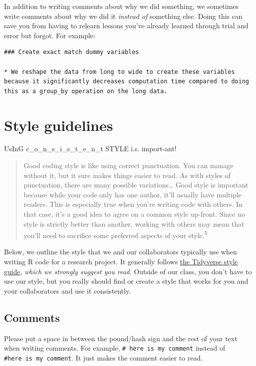 \documentclass[
  letterpaper,
  DIV=11,
  numbers=noendperiod]{scrreprt}
\begin{document}
In addition to writing comments about why we did something, we sometimes
write comments about why we did it \emph{instead of} something else.
Doing this can save you from having to relearn lessons you've already
learned through trial and error but forgot. For example:

\begin{verbatim}
### Create exact match dummy variables

* We reshape the data from long to wide to create these variables because it significantly decreases computation time compared to doing this as a group_by operation on the long data. 
\end{verbatim}

\section{Style guidelines}\label{style-guidelines}

UsInG c\_o\_n\_s\_i\_s\_t\_e\_n\_t STYLE i.s. import-ant!

\begin{quote}
Good coding style is like using correct punctuation. You can manage
without it, but it sure makes things easier to read. As with styles of
punctuation, there are many possible variations\ldots{} Good style is
important because while your code only has one author, it'll usually
have multiple readers. This is especially true when you're writing code
with others. In that case, it's a good idea to agree on a common style
up-front. Since no style is strictly better than another, working with
others may mean that you'll need to sacrifice some preferred aspects of
your style.\textsuperscript{5}
\end{quote}

Below, we outline the style that we and our collaborators typically use
when writing R code for a research project. It generally follows
\href{https://style.tidyverse.org/}{the Tidyverse style guide},
\emph{which we strongly suggest you read}. Outside of our class, you
don't have to use our style, but you really should find or create a
style that works for you and your collaborators and use it consistently.

\subsection{Comments}\label{comments-1}

Please put a space in between the pound/hash sign and the rest of your
text when writing comments. For example,
\texttt{\#\ here\ is\ my\ comment} instead of
\texttt{\#here\ is\ my\ comment}. It just makes the comment easier to
read.
\end{document}
